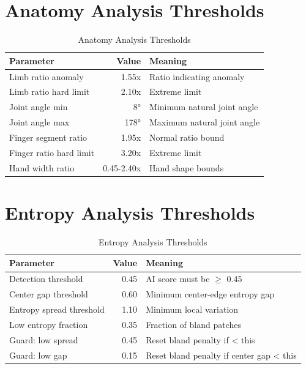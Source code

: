 \documentclass[12pt,a4paper]{book}
\begin{document}
\begin{itemize}
\section{Anatomy Analysis Thresholds}

\begin{table}[H]
\centering
\captionsetup{justification=centering}
\caption{Anatomy Analysis Thresholds}
\begin{tabular}{|l|r|p{4cm}|}
\hline
\textbf{Parameter} & \textbf{Value} & \textbf{Meaning} \\
\hline
Limb ratio anomaly & 1.55x & Ratio indicating anomaly \\
\hline
Limb ratio hard limit & 2.10x & Extreme limit \\
\hline
Joint angle min & 8° & Minimum natural joint angle \\
\hline
Joint angle max & 178° & Maximum natural joint angle \\
\hline
Finger segment ratio & 1.95x & Normal ratio bound \\
\hline
Finger ratio hard limit & 3.20x & Extreme limit \\
\hline
Hand width ratio & 0.45-2.40x & Hand shape bounds \\
\hline
\end{tabular}
\end{table}

\section{Entropy Analysis Thresholds}

\begin{table}[H]
\centering
\captionsetup{justification=centering}
\caption{Entropy Analysis Thresholds}
\begin{tabular}{|l|r|p{4cm}|}
\hline
\textbf{Parameter} & \textbf{Value} & \textbf{Meaning} \\
\hline
Detection threshold & 0.45 & AI score must be $\geq$ 0.45 \\
\hline
Center gap threshold & 0.60 & Minimum center-edge entropy gap \\
\hline
Entropy spread threshold & 1.10 & Minimum local variation \\
\hline
Low entropy fraction & 0.35 & Fraction of bland patches \\
\hline
Guard: low spread & 0.45 & Reset bland penalty if < this \\
\hline
Guard: low gap & 0.15 & Reset bland penalty if center gap < this \\
\hline
\end{tabular}
\end{table}


\end{itemize}
\end{document}
